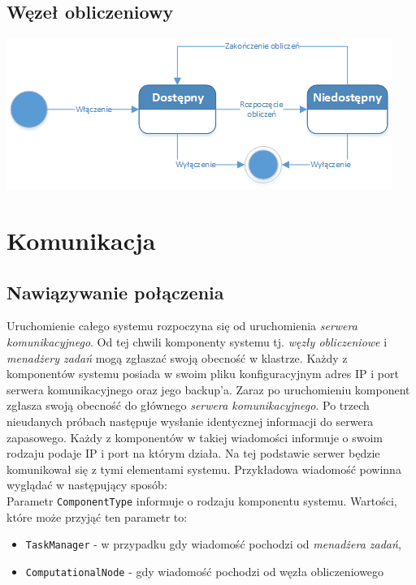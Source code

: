 \documentclass[12pt,a4paper,titlepage]{report}
\begin{document}
		\section{Węzeł obliczeniowy}
		\includegraphics[width=\textwidth]{img/state/ComputationalNode.png}

	\chapter{Komunikacja}
	\section{Nawiązywanie połączenia}
	Uruchomienie całego systemu rozpoczyna się od uruchomienia \textit{serwera komunikacyjnego}. Od tej chwili komponenty systemu 
	tj. \textit{węzły obliczeniowe}
	i \textit{menadżery zadań} mogą zgłaszać swoją obecność w klastrze. Każdy z komponentów systemu posiada w swoim pliku konfiguracyjnym adres IP i port serwera komunikacyjnego oraz jego backup'a. Zaraz po uruchomieniu komponent zgłasza swoją obecność  do głównego \textit{serwera komunikacyjnego}. Po trzech nieudanych próbach następuje wysłanie identycznej informacji do serwera zapasowego. Każdy z komponentów w takiej wiadomości informuje o swoim rodzaju podaje IP i port na którym działa. 
	Na tej podstawie serwer będzie komunikował się z tymi elementami systemu. Przykładowa wiadomość powinna wyglądać w następujący sposób: \\
	  

	Parametr \verb+ComponentType+ informuje o rodzaju komponentu systemu. Wartości, które może przyjąć ten parametr to:
	\begin{itemize}
		\item \verb+TaskManager+ - w przypadku gdy wiadomość pochodzi od \textit{menadżera zadań},
		\item \verb+ComputationalNode+ - gdy wiadomość pochodzi od węzła obliczeniowego
	\end{itemize}		 
\end{document}
